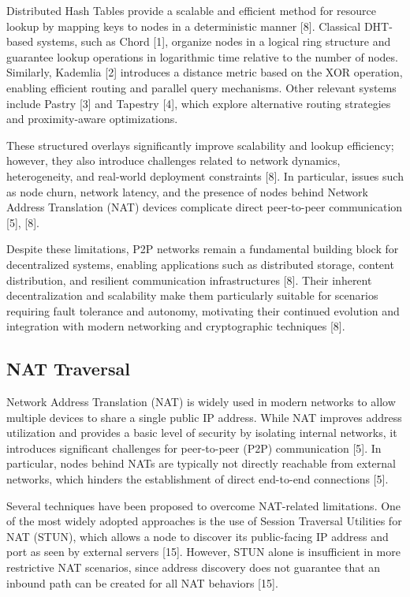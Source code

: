 \documentclass[12pt]{article}
\begin{document}
Distributed Hash Tables provide a scalable and efficient method for resource lookup by mapping keys to nodes in a deterministic manner [8]. Classical DHT-based systems, such as Chord [1], organize nodes in a logical ring structure and guarantee lookup operations in logarithmic time relative to the number of nodes. Similarly, Kademlia [2] introduces a distance metric based on the XOR operation, enabling efficient routing and parallel query mechanisms. Other relevant systems include Pastry [3] and Tapestry [4], which explore alternative routing strategies and proximity-aware optimizations.

These structured overlays significantly improve scalability and lookup efficiency; however, they also introduce challenges related to network dynamics, heterogeneity, and real-world deployment constraints [8]. In particular, issues such as node churn, network latency, and the presence of nodes behind Network Address Translation (NAT) devices complicate direct peer-to-peer communication [5], [8].

Despite these limitations, P2P networks remain a fundamental building block for decentralized systems, enabling applications such as distributed storage, content distribution, and resilient communication infrastructures [8]. Their inherent decentralization and scalability make them particularly suitable for scenarios requiring fault tolerance and autonomy, motivating their continued evolution and integration with modern networking and cryptographic techniques [8].

\subsection{NAT Traversal}

Network Address Translation (NAT) is widely used in modern networks to allow multiple devices to share a single public IP address. While NAT improves address utilization and provides a basic level of security by isolating internal networks, it introduces significant challenges for peer-to-peer (P2P) communication [5]. In particular, nodes behind NATs are typically not directly reachable from external networks, which hinders the establishment of direct end-to-end connections [5].

Several techniques have been proposed to overcome NAT-related limitations. One of the most widely adopted approaches is the use of Session Traversal Utilities for NAT (STUN), which allows a node to discover its public-facing IP address and port as seen by external servers [15]. However, STUN alone is insufficient in more restrictive NAT scenarios, since address discovery does not guarantee that an inbound path can be created for all NAT behaviors [15].
\end{document}
